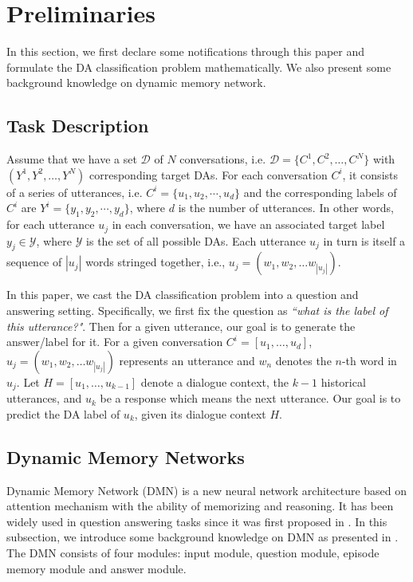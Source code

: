 \documentclass[conference]{IEEEtran}
\begin{document}
	\section{Preliminaries}\label{sec_preliminaries}
	In this section, we first declare some notifications through this paper and formulate the DA classification problem mathematically. We also present some background knowledge on dynamic memory network.
	
	\subsection{Task Description}
	Assume that we have a set $\mathcal{D}$ of $N$ conversations, i.e. $\mathcal{D}=\{C^1, C^2, \ldots, C^N\}$ with $(Y^1, Y^2, \ldots, Y^N)$ corresponding target DAs. For each conversation $C^i$, it consists of a series of utterances, i.e. $C^i=\{u_1,u_2,\cdots,u_d\}$ and the corresponding labels of $C^i$ are $Y^i = \{y_1,y_2,\cdots,y_d\}$, where $d$ is the number of utterances. In other words, for each utterance $u_j$ in each conversation, we have an associated target label $y_j \in \mathcal{Y}$, where $\mathcal{Y}$ is the set of all possible DAs. Each utterance $u_j$ in turn is itself a sequence of $|u_j|$ words stringed together, i.e., $u_j = (w_1, w_2, \ldots w_{|u_j|})$.
	
	In this paper, we cast the DA classification problem into a question and answering setting. Specifically, we first fix the question as \textit{``what is the label of this utterance?"}. Then for a given utterance, our goal is to generate the answer/label for it. For a given conversation $C^i=[u_1, \ldots, u_d]$, $u_j = (w_1, w_2, \ldots w_{|u_j|})$ represents an utterance and $w_n$ denotes the $n$-th word in $u_j$. Let $H=[u_1, \ldots, u_{k-1}]$ denote a dialogue context, the $k-1$ historical utterances, and $u_k$ be a response which means the next utterance. Our goal is to predict the DA label of $u_k$, given its dialogue context $H$.
	
	\subsection{Dynamic Memory Networks}
	Dynamic Memory Network (DMN) is a new neural network architecture based on attention mechanism with the ability of memorizing and reasoning. It has been widely used in question answering tasks since it was first proposed in \cite{kumar2016ask}. In this subsection, we introduce some background knowledge on DMN as presented in \cite{kumar2016ask}. The DMN consists of four modules: input module, question module, episode memory module and answer module. 
	
\end{document}
